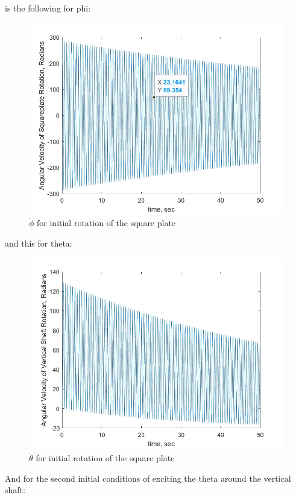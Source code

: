 is the following for phi:
\begin{figure}[ht]
    \centering
    \includegraphics[scale=0.5]{images/phid_case_1.jpg}
    \caption{$\dot\phi$ for initial rotation of the square plate}
    \label{fig:phid_case1}
\end{figure}
and this for theta:
\begin{figure}[ht]
    \centering
    \includegraphics[scale=0.5]{images/thetad_case_1.jpg}
    \caption{$\dot\theta$ for initial rotation of the square plate}
    \label{fig:thetad_case1}
\end{figure}

And for the second initial conditions of exciting the theta around the vertical shaft:


